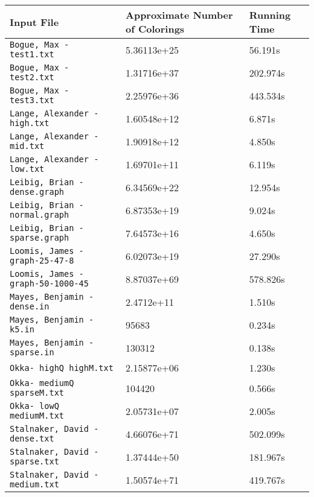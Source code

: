 \documentclass[14]{article}
\begin{document}
\begin{center}
\begin{tabular}{|l|l|l|}
\hline
Input File & Approximate Number of Colorings & Running Time \\\hline
\texttt{Bogue, Max - test1.txt} & 5.36113e+25 & 56.191s\\\hline
\texttt{Bogue, Max - test2.txt} & 1.31716e+37 & 202.974s\\\hline
\texttt{Bogue, Max - test3.txt} & 2.25976e+36 & 443.534s\\\hline
\texttt{Lange, Alexander - high.txt} & 1.60548e+12 & 6.871s\\\hline
\texttt{Lange, Alexander - mid.txt} & 1.90918e+12 & 4.850s\\\hline
\texttt{Lange, Alexander - low.txt} & 1.69701e+11 & 6.119s\\\hline
\texttt{Leibig, Brian - dense.graph} & 6.34569e+22 & 12.954s\\\hline
\texttt{Leibig, Brian - normal.graph} & 6.87353e+19 & 9.024s\\\hline
\texttt{Leibig, Brian - sparse.graph} & 7.64573e+16 & 4.650s\\\hline
\texttt{Loomis, James - graph-25-47-8} & 6.02073e+19 & 27.290s\\\hline
\texttt{Loomis, James - graph-50-1000-45} & 8.87037e+69 & 578.826s\\\hline
\texttt{Mayes, Benjamin - dense.in} & 2.4712e+11 & 1.510s \\\hline
\texttt{Mayes, Benjamin - k5.in} & 95683 & 0.234s\\\hline
\texttt{Mayes, Benjamin - sparse.in} & 130312 & 0.138s\\\hline
\texttt{Okka- highQ highM.txt} & 2.15877e+06 & 1.230s\\\hline
\texttt{Okka- mediumQ sparseM.txt} & 104420 & 0.566s\\\hline
\texttt{Okka- lowQ mediumM.txt} & 2.05731e+07 & 2.005s\\\hline
\texttt{Stalnaker, David - dense.txt}  &  4.66076e+71 & 502.099s\\\hline
\texttt{Stalnaker, David - sparse.txt} & 1.37444e+50 & 181.967s \\\hline
\texttt{Stalnaker, David - medium.txt} &  1.50574e+71 &419.767s\\\hline
\end{tabular}
\end{center}
\end{document}
